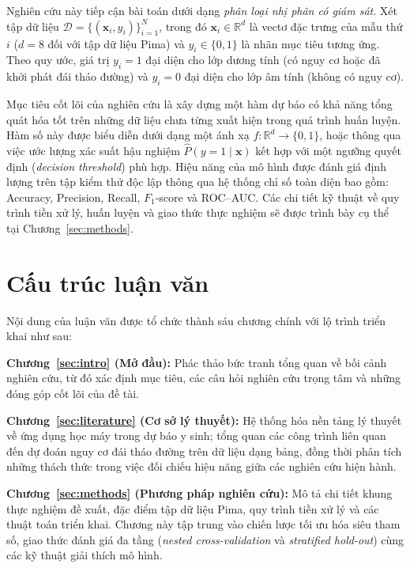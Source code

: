 \documentclass[14pt,a4paper]{extreport}
\begin{document}
Nghiên cứu này tiếp cận bài toán dưới dạng \emph{phân loại nhị phân có giám sát}. Xét tập dữ liệu $\mathcal{D} = \{(\mathbf{x}_i, y_i)\}_{i=1}^{N}$, trong đó $\mathbf{x}_i \in \mathbb{R}^d$ là vectơ đặc trưng của mẫu thứ $i$ ($d=8$ đối với tập dữ liệu Pima) và $y_i \in \{0,1\}$ là nhãn mục tiêu tương ứng. Theo quy ước, giá trị $y_i=1$ đại diện cho lớp dương tính (có nguy cơ hoặc đã khởi phát đái tháo đường) và $y_i=0$ đại diện cho lớp âm tính (không có nguy cơ).

Mục tiêu cốt lõi của nghiên cứu là xây dựng một hàm dự báo có khả năng tổng quát hóa tốt trên những dữ liệu chưa từng xuất hiện trong quá trình huấn luyện. Hàm số này được biểu diễn dưới dạng một ánh xạ $f:\mathbb{R}^d \to \{0,1\}$, hoặc thông qua việc ước lượng xác suất hậu nghiệm $\hat{P}(y=1 \mid \mathbf{x})$ kết hợp với một ngưỡng quyết định (\textit{decision threshold}) phù hợp. Hiệu năng của mô hình được đánh giá định lượng trên tập kiểm thử độc lập thông qua hệ thống chỉ số toàn diện bao gồm: Accuracy, Precision, Recall, $F_1$-score và ROC--AUC. Các chi tiết kỹ thuật về quy trình tiền xử lý, huấn luyện và giao thức thực nghiệm sẽ được trình bày cụ thể tại Chương~\ref{sec:methods}.

\section{Cấu trúc luận văn}

Nội dung của luận văn được tổ chức thành sáu chương chính với lộ trình triển khai như sau:

\textbf{Chương~\ref{sec:intro} (Mở đầu):} Phác thảo bức tranh tổng quan về bối cảnh nghiên cứu, từ đó xác định mục tiêu, các câu hỏi nghiên cứu trọng tâm và những đóng góp cốt lõi của đề tài.

\textbf{Chương~\ref{sec:literature} (Cơ sở lý thuyết):} Hệ thống hóa nền tảng lý thuyết về ứng dụng học máy trong dự báo y sinh; tổng quan các công trình liên quan đến dự đoán nguy cơ đái tháo đường trên dữ liệu dạng bảng, đồng thời phân tích những thách thức trong việc đối chiếu hiệu năng giữa các nghiên cứu hiện hành.

\textbf{Chương~\ref{sec:methods} (Phương pháp nghiên cứu):} Mô tả chi tiết khung thực nghiệm đề xuất, đặc điểm tập dữ liệu Pima, quy trình tiền xử lý và các thuật toán triển khai. Chương này tập trung vào chiến lược tối ưu hóa siêu tham số, giao thức đánh giá đa tầng (\textit{nested cross-validation} và \textit{stratified hold-out}) cùng các kỹ thuật giải thích mô hình.
\end{document}
